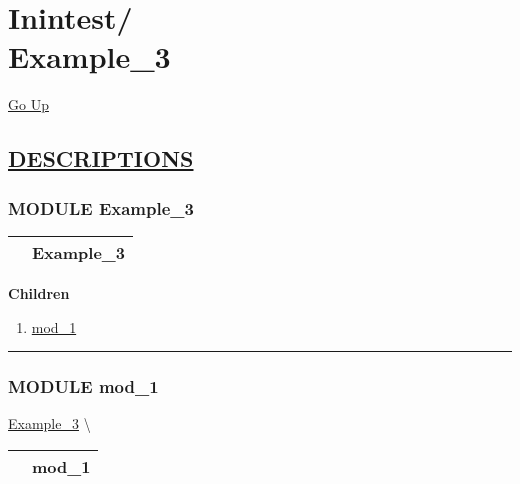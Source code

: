 \chapter*{\color{headfile}
{\large Inintest\slash\hspace{0pt}}
 \\
Example_3
}
\hypertarget{ecldoc:toc:Inintest.Example_3}{}
\hyperlink{ecldoc:toc:root/Inintest}{Go Up}


\section*{\underline{\textsf{DESCRIPTIONS}}}
\subsection*{\textsf{\colorbox{headtoc}{\color{white} MODULE}
Example\_3}}

\hypertarget{ecldoc:Inintest.Example_3}{}

{\renewcommand{\arraystretch}{1.5}
\begin{tabularx}{\textwidth}{|>{\raggedright\arraybackslash}l|X|}
\hline
\hspace{0pt}\mytexttt{\color{red} } & \textbf{Example\_3} \\
\hline
\end{tabularx}
}

\par


\textbf{Children}
\begin{enumerate}
\item \hyperlink{ecldoc:Inintest.Example_3.mod_1}{mod\_1}
\end{enumerate}

\rule{\linewidth}{0.5pt}

\subsection*{\textsf{\colorbox{headtoc}{\color{white} MODULE}
mod\_1}}

\hypertarget{ecldoc:Inintest.Example_3.mod_1}{}
\hspace{0pt} \hyperlink{ecldoc:Inintest.Example_3}{Example_3} \textbackslash 

{\renewcommand{\arraystretch}{1.5}
\begin{tabularx}{\textwidth}{|>{\raggedright\arraybackslash}l|X|}
\hline
\hspace{0pt}\mytexttt{\color{red} } & \textbf{mod\_1} \\
\hline
\end{tabularx}
}

